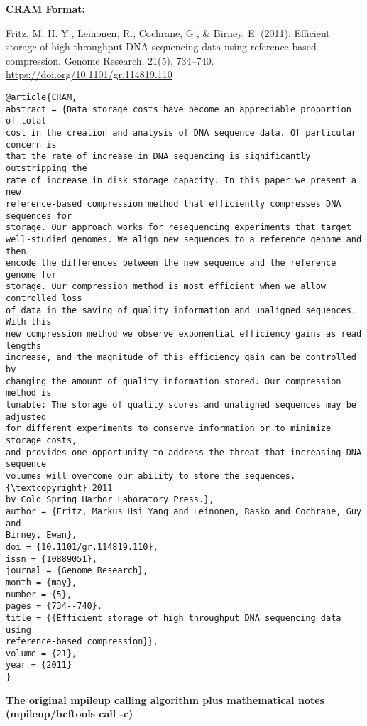 \documentclass[]{article}
\begin{document}
\textbf{CRAM Format:}

Fritz, M. H. Y., Leinonen, R., Cochrane, G., \& Birney, E. (2011). Efficient storage of high throughput DNA sequencing data using reference-based compression. Genome Research, 21(5), 734–740. \url{https://doi.org/10.1101/gr.114819.110}

\begin{verbatim}
@article{CRAM,
abstract = {Data storage costs have become an appreciable proportion of total
cost in the creation and analysis of DNA sequence data. Of particular concern is
that the rate of increase in DNA sequencing is significantly outstripping the
rate of increase in disk storage capacity. In this paper we present a new
reference-based compression method that efficiently compresses DNA sequences for
storage. Our approach works for resequencing experiments that target
well-studied genomes. We align new sequences to a reference genome and then
encode the differences between the new sequence and the reference genome for
storage. Our compression method is most efficient when we allow controlled loss
of data in the saving of quality information and unaligned sequences. With this
new compression method we observe exponential efficiency gains as read lengths
increase, and the magnitude of this efficiency gain can be controlled by
changing the amount of quality information stored. Our compression method is
tunable: The storage of quality scores and unaligned sequences may be adjusted
for different experiments to conserve information or to minimize storage costs,
and provides one opportunity to address the threat that increasing DNA sequence
volumes will overcome our ability to store the sequences. {\textcopyright} 2011
by Cold Spring Harbor Laboratory Press.},
author = {Fritz, Markus Hsi Yang and Leinonen, Rasko and Cochrane, Guy and
Birney, Ewan},
doi = {10.1101/gr.114819.110},
issn = {10889051},
journal = {Genome Research},
month = {may},
number = {5},
pages = {734--740},
title = {{Efficient storage of high throughput DNA sequencing data using
reference-based compression}},
volume = {21},
year = {2011}
}
\end{verbatim}

\textbf{The original mpileup calling algorithm plus mathematical notes (mpileup/bcftools call -c)}
\end{document}
